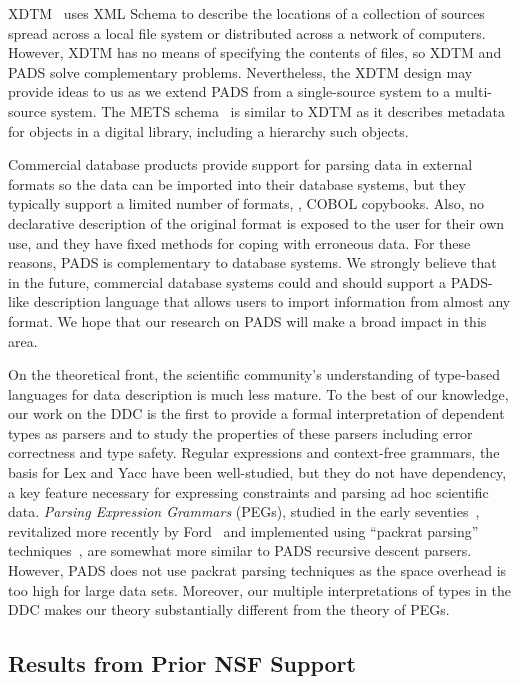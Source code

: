 \documentclass[11pt]{article}
\begin{document}
XDTM~\cite{zhao+:sigmod05,xdtm} uses XML Schema to describe the
locations of a collection of sources spread across a local file system
or distributed across a network of computers.  However, XDTM has no
means of specifying the contents of files, so XDTM and PADS solve
complementary problems.  Nevertheless, the XDTM design may provide
ideas to us as we extend PADS from a single-source system to a
multi-source system. The METS schema~\cite{mets} is similar to XDTM as
it describes metadata for objects in a digital library, including a
hierarchy such objects.

Commercial database products provide support for
parsing data in external formats so the data can be imported into
their database systems, but they typically support a limited number of
formats, \eg{}, COBOL copybooks.  Also, no declarative description of the
original format is exposed to the user for their own use, and they
have fixed methods for coping with erroneous data.  For these reasons,
PADS is complementary to database systems.  We strongly believe that
in the future, commercial database systems could and should support a 
PADS-like description language that allows users to import information from
almost any format.  We hope that our research on PADS will make a broad
impact in this area.

On the theoretical front, the scientific community's understanding of
type-based languages for data description is much less mature.  To the
best of our knowledge, our work on the DDC is the first to provide a
formal interpretation of dependent types as parsers and to study the
properties of these parsers including error correctness and type
safety.  Regular expressions and context-free grammars, the basis for
Lex and Yacc have been well-studied, but they do not have dependency,
a key feature necessary for expressing constraints and parsing ad hoc
scientific data.  {\em Parsing Expression Grammars} (PEGs), studied in
the early seventies~\cite{birman+:parsing}, revitalized more recently
by Ford~\cite{ford:pegs} and implemented using ``packrat parsing''
techniques~\cite{ford:packrat,grimm:packrat}, are somewhat more
similar to PADS recursive descent parsers. However, PADS does not use
packrat parsing techniques as the space overhead is too high for large
data sets.  Moreover, our multiple interpretations of types
in the DDC makes our theory substantially different from the theory of
PEGs.

\subsection{Results from Prior NSF Support}
\label{ssec:results}
\end{document}
